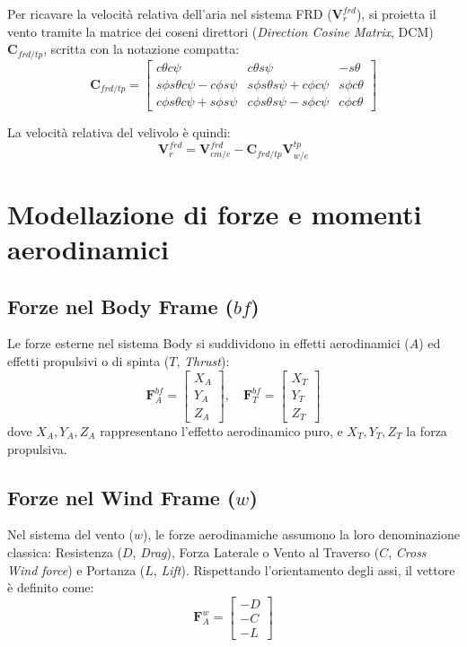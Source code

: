 Per ricavare la velocità relativa dell'aria nel sistema FRD ($\mathbf{V}_r^{frd}$), si proietta il vento tramite la matrice dei coseni direttori (\textit{Direction Cosine Matrix}, DCM) $\mathbf{C}_{frd/tp}$, scritta con la notazione compatta:
\begin{equation}
\mathbf{C}_{frd/tp} = 
\begin{bmatrix}
c\theta c\psi & c\theta s\psi & -s\theta \\
s\phi s\theta c\psi - c\phi s\psi & s\phi s\theta s\psi + c\phi c\psi & s\phi c\theta \\
c\phi s\theta c\psi + s\phi s\psi & c\phi s\theta s\psi - s\phi c\psi & c\phi c\theta
\end{bmatrix}
\end{equation}

La velocità relativa del velivolo è quindi:
\begin{equation}
\mathbf{V}_r^{frd} = \mathbf{V}_{cm/e}^{frd} - \mathbf{C}_{frd/tp} \mathbf{V}_{w/e}^{tp}
\end{equation}



\section{Modellazione di forze e momenti aerodinamici}

\subsection{Forze nel Body Frame ($bf$)}
Le forze esterne nel sistema Body si suddividono in effetti aerodinamici ($A$) ed effetti propulsivi o di spinta ($T$, \textit{Thrust}):
\begin{equation}
\mathbf{F}_A^{bf} = \begin{bmatrix} X_A \\ Y_A \\ Z_A \end{bmatrix}, \quad \mathbf{F}_T^{bf} = \begin{bmatrix} X_T \\ Y_T \\ Z_T \end{bmatrix}
\end{equation}
dove $X_A, Y_A, Z_A$ rappresentano l'effetto aerodinamico puro, e $X_T, Y_T, Z_T$ la forza propulsiva.

\subsection{Forze nel Wind Frame ($w$)}
Nel sistema del vento ($w$), le forze aerodinamiche assumono la loro denominazione classica: Resistenza ($D$, \textit{Drag}), Forza Laterale o Vento al Traverso ($C$, \textit{Cross Wind force}) e Portanza ($L$, \textit{Lift}). Rispettando l'orientamento degli assi, il vettore è definito come:
\begin{equation}
\mathbf{F}_A^w = \begin{bmatrix} -D \\ -C \\ -L \end{bmatrix}
\end{equation}

